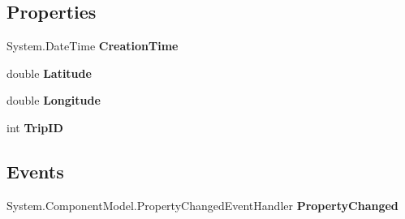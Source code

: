 \subsection*{Properties}
\begin{DoxyCompactItemize}
\item 
\hypertarget{class_silverlight_showcase_1_1_tripi_silverlight_w_c_f_service_reference_1_1_position_node_ad9ab4f30b041b98e17ed64bb3e86e452}{
System.DateTime {\bfseries CreationTime}}
\label{class_silverlight_showcase_1_1_tripi_silverlight_w_c_f_service_reference_1_1_position_node_ad9ab4f30b041b98e17ed64bb3e86e452}

\item 
\hypertarget{class_silverlight_showcase_1_1_tripi_silverlight_w_c_f_service_reference_1_1_position_node_ac0dde4ffe739e084e272baf0824e82fa}{
double {\bfseries Latitude}}
\label{class_silverlight_showcase_1_1_tripi_silverlight_w_c_f_service_reference_1_1_position_node_ac0dde4ffe739e084e272baf0824e82fa}

\item 
\hypertarget{class_silverlight_showcase_1_1_tripi_silverlight_w_c_f_service_reference_1_1_position_node_a25d305bb93b947b4bf2fc3faf91c8c5f}{
double {\bfseries Longitude}}
\label{class_silverlight_showcase_1_1_tripi_silverlight_w_c_f_service_reference_1_1_position_node_a25d305bb93b947b4bf2fc3faf91c8c5f}

\item 
\hypertarget{class_silverlight_showcase_1_1_tripi_silverlight_w_c_f_service_reference_1_1_position_node_a14f668cd903a0b4f81160be398131557}{
int {\bfseries TripID}}
\label{class_silverlight_showcase_1_1_tripi_silverlight_w_c_f_service_reference_1_1_position_node_a14f668cd903a0b4f81160be398131557}

\end{DoxyCompactItemize}
\subsection*{Events}
\begin{DoxyCompactItemize}
\item 
\hypertarget{class_silverlight_showcase_1_1_tripi_silverlight_w_c_f_service_reference_1_1_position_node_af09f3a082acb47503961da0e784ca840}{
System.ComponentModel.PropertyChangedEventHandler {\bfseries PropertyChanged}}
\label{class_silverlight_showcase_1_1_tripi_silverlight_w_c_f_service_reference_1_1_position_node_af09f3a082acb47503961da0e784ca840}

\end{DoxyCompactItemize}


